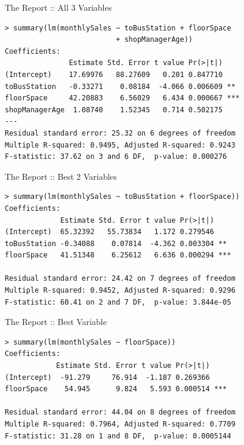 \documentclass{beamer}
\begin{document}
\begin{frame}[fragile]{The Report :: All 3 Variables}

\begin{footnotesize}
\begin{verbatim}
> summary(lm(monthlySales ~ toBusStation + floorSpace
                          + shopManagerAge))
Coefficients:
               Estimate Std. Error t value Pr(>|t|)    
(Intercept)    17.69976   88.27609   0.201 0.847710    
toBusStation   -0.33271    0.08184  -4.066 0.006609 ** 
floorSpace     42.20883    6.56029   6.434 0.000667 ***
shopManagerAge  1.08740    1.52345   0.714 0.502175    
---
Residual standard error: 25.32 on 6 degrees of freedom
Multiple R-squared: 0.9495, Adjusted R-squared: 0.9243 
F-statistic: 37.62 on 3 and 6 DF,  p-value: 0.000276 
\end{verbatim}
\end{footnotesize}

\end{frame}

\begin{frame}[fragile]{The Report :: Best 2 Variables}

\begin{footnotesize}
\begin{verbatim}
> summary(lm(monthlySales ~ toBusStation + floorSpace))
Coefficients:
             Estimate Std. Error t value Pr(>|t|)    
(Intercept)  65.32392   55.73834   1.172 0.279546    
toBusStation -0.34088    0.07814  -4.362 0.003304 ** 
floorSpace   41.51348    6.25612   6.636 0.000294 ***

Residual standard error: 24.42 on 7 degrees of freedom
Multiple R-squared: 0.9452, Adjusted R-squared: 0.9296 
F-statistic: 60.41 on 2 and 7 DF,  p-value: 3.844e-05
\end{verbatim}
\end{footnotesize}

\end{frame}

\begin{frame}[fragile]{The Report :: Best Variable}

\begin{footnotesize}
\begin{verbatim}
> summary(lm(monthlySales ~ floorSpace))
Coefficients:
            Estimate Std. Error t value Pr(>|t|)    
(Intercept)  -91.279     76.914  -1.187 0.269366    
floorSpace    54.945      9.824   5.593 0.000514 ***

Residual standard error: 44.04 on 8 degrees of freedom
Multiple R-squared: 0.7964, Adjusted R-squared: 0.7709 
F-statistic: 31.28 on 1 and 8 DF,  p-value: 0.0005144
\end{verbatim}
\end{footnotesize}

\end{frame}
\end{document}
